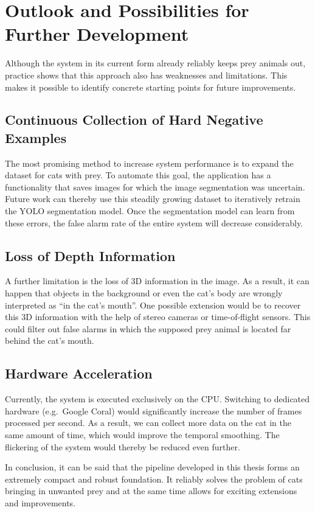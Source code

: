 \section{Outlook and Possibilities for Further Development}
\label{subsec:ausblick}

Although the system in its current form already reliably keeps prey animals out, practice shows that this approach also has weaknesses and limitations. This makes it possible to identify concrete starting points for future improvements.

\subsection{Continuous Collection of Hard Negative Examples}
The most promising method to increase system performance is to expand the dataset for cats with prey. To automate this goal, the application has a functionality that saves images for which the image segmentation was uncertain. Future work can thereby use this steadily growing dataset to iteratively retrain the YOLO segmentation model. Once the segmentation model can learn from these errors, the false alarm rate of the entire system will decrease considerably.

\subsection{Loss of Depth Information}
A further limitation is the loss of 3D information in the image. As a result, it can happen that objects in the background or even the cat's body are wrongly interpreted as ``in the cat's mouth''. One possible extension would be to recover this 3D information with the help of stereo cameras or time-of-flight sensors. This could filter out false alarms in which the supposed prey animal is located far behind the cat's mouth.

\subsection{Hardware Acceleration}
Currently, the system is executed exclusively on the CPU. Switching to dedicated hardware (e.g.\ Google Coral) would significantly increase the number of frames processed per second. As a result, we can collect more data on the cat in the same amount of time, which would improve the temporal smoothing. The flickering of the system would thereby be reduced even further.

\vspace{0.5cm}

In conclusion, it can be said that the pipeline developed in this thesis forms an extremely compact and robust foundation. It reliably solves the problem of cats bringing in unwanted prey and at the same time allows for exciting extensions and improvements.
